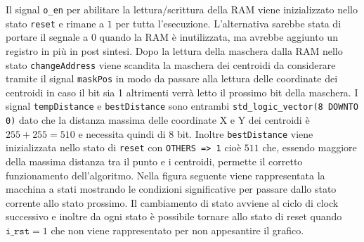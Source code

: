 \documentclass{article}
\begin{document}
	\newline 
	Il signal \texttt{o\_en} per abilitare la lettura/scrittura della RAM viene inizializzato nello stato \texttt{reset} e rimane a $1$ per tutta l'esecuzione. L'alternativa sarebbe stata di portare il segnale a $0$ quando la RAM \`{e} inutilizzata, ma avrebbe aggiunto un registro in pi\`{u} in post sintesi.\medskip
	\newline
	Dopo la lettura della maschera dalla RAM nello stato \texttt{changeAddress} viene scandita la maschera dei centroidi da considerare tramite il signal \texttt{maskPos} in modo da passare alla lettura delle coordinate dei centroidi in caso il bit sia 1 altrimenti verr\`{a} letto il prossimo bit della maschera. \medskip
	\newline
	I signal \texttt{tempDistance} e \texttt{bestDistance} sono entrambi \texttt{std\_logic\_vector(8 DOWNTO 0)} dato che la distanza massima delle coordinate X e Y dei centroidi \`{e} $255+255=510$ e necessita quindi di 8 bit. Inoltre \texttt{bestDistance} viene inizializzata nello stato di \texttt{reset} con \texttt{OTHERS => \textsc{}1\textsc{}} cio\`{e} $511$ che, essendo maggiore della massima distanza tra il punto e i centroidi, permette il corretto funzionamento dell'algoritmo. \medskip
	\newline
	Nella figura seguente viene rappresentata la macchina a stati mostrando le condizioni significative per passare dallo stato corrente allo stato prossimo. Il cambiamento di stato avviene al ciclo di clock successivo e inoltre da ogni stato \`{e} possibile tornare allo stato di reset quando $\texttt{i\_rst}=1$ che non viene rappresentato per non appesantire il grafico.
	\pagebreak
	
	
	 
	\pagebreak
	
	
\end{document}
